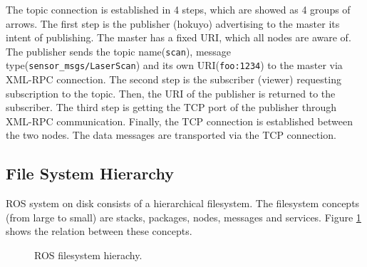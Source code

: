 \documentclass[a4paper, 10pt, conference]{ieeeconf}       %
\begin{document}
The topic connection is established in 4 steps, which are showed as 4 groups of arrows. The first step is the publisher (hokuyo) advertising to the master its intent of publishing. The master has a fixed URI, which all nodes are aware of. The publisher sends the topic name(\texttt{scan}), message type(\texttt{sensor\_msgs/LaserScan}) and its own URI(\texttt{foo:1234}) to the master via XML-RPC connection. The second step is the subscriber (viewer) requesting subscription to the topic. Then, the URI of the publisher is returned to the subscriber. The third step is getting the TCP port of the publisher through XML-RPC communication. Finally, the TCP connection is established between the two nodes. The data messages are transported via the TCP connection.

\subsection{File System Hierarchy}

ROS system on disk consists of a hierarchical filesystem. The filesystem concepts (from large to small) are stacks, packages, nodes, messages and services. Figure \ref{fig:filesystem} shows the relation between these concepts.

\begin{figure}[htbp]
  \centering
{}
  \caption{ROS filesystem hierachy.}
  \label{fig:filesystem}
\end{figure}
\end{document}
